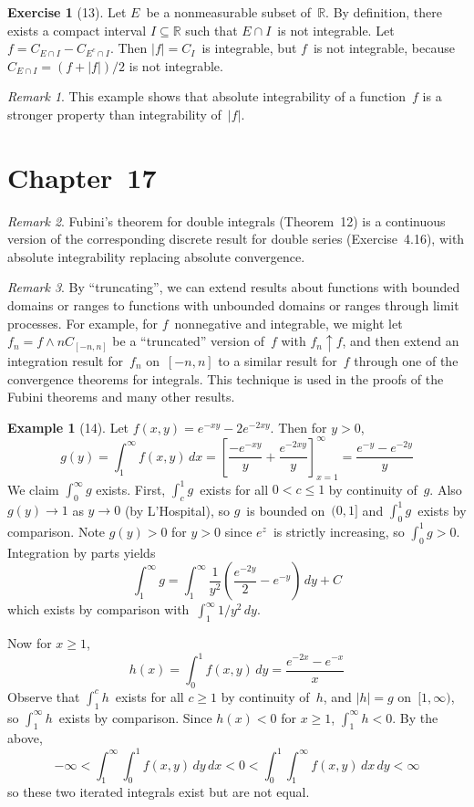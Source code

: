 \documentclass[letterpaper,12pt]{article}
\newcommand{\R}{\mathbb{R}}
\newcommand{\upto}{\uparrow}
\newcommand{\sect}{\cap}
\newcommand{\fmin}{\wedge}
\renewcommand{\d}[1]{\,d\!{#1}}
\newcommand{\dx}{\d{x}}
\newcommand{\dy}{\d{y}}
\newcommand{\abs}[1]{|{#1}|}
\newcommand{\comp}[1]{#1^c}
\theoremstyle{plain}
\theoremstyle{definition}
\newtheorem*{exmp}{Example}
\newtheorem*{exer}{Exercise}
\theoremstyle{remark}
\newtheorem*{rmk}{Remark}
\begin{document}
\begin{exer}[13]
Let \(E\)~be a nonmeasurable subset of~\(\R\). By definition, there exists a compact interval \(I\subseteq\R\) such that \(E\sect I\)~is not integrable. Let \(f=C_{E\sect I}-C_{\comp{E}\sect I}\). Then \(\abs{f}=C_I\)~is integrable, but \(f\)~is not integrable, because \(C_{E\sect I}=(f+\abs{f})/2\) is not integrable.
\end{exer}
\begin{rmk}
This example shows that absolute integrability of a function~\(f\) is a stronger property than integrability of~\(\abs{f}\).
\end{rmk}

\section*{Chapter~17}
\begin{rmk}
Fubini's theorem for double integrals (Theorem~12) is a continuous version of the corresponding discrete result for double series (Exercise~4.16), with absolute integrability replacing absolute convergence.
\end{rmk}

\begin{rmk}
By ``truncating'', we can extend results about functions with bounded domains or ranges to functions with unbounded domains or ranges through limit processes. For example, for \(f\)~nonnegative and integrable, we might let \(f_n=f\fmin nC_{[-n,n]}\) be a ``truncated'' version of~\(f\) with \(f_n\upto f\), and then extend an integration result for~\(f_n\) on~\([-n,n]\) to a similar result for~\(f\) through one of the convergence theorems for integrals. This technique is used in the proofs of the Fubini theorems and many other results.
\end{rmk}

\begin{exmp}[14]
Let \(f(x,y)=e^{-xy}-2e^{-2xy}\). Then for \(y>0\),
\[g(y)=\int_1^{\infty}f(x,y)\dx=\left[\frac{-e^{-xy}}{y}+\frac{e^{-2xy}}{y}\right]_{x=1}^{\infty}=\frac{e^{-y}-e^{-2y}}{y}\]
We claim \(\int_0^{\infty}g\) exists. First, \(\int_c^1 g\)~exists for all \(0<c\le 1\) by continuity of~\(g\). Also \(g(y)\to 1\) as \(y\to 0\) (by L'Hospital), so \(g\)~is bounded on~\((0,1]\) and \(\int_0^1 g\)~exists by comparison. Note \(g(y)>0\) for \(y>0\) since \(e^z\)~is strictly increasing, so \(\int_0^1g>0\). Integration by parts yields
\[\int_1^{\infty}g=\int_1^{\infty}\frac{1}{y^2}\left(\frac{e^{-2y}}{2}-e^{-y}\right)\dy+C\]
which exists by comparison with~\(\int_1^{\infty}1/y^2\dy\).

Now for \(x\ge 1\),
\[h(x)=\int_0^1 f(x,y)\dy=\frac{e^{-2x}-e^{-x}}{x}\]
Observe that \(\int_1^c h\)~exists for all \(c\ge 1\) by continuity of~\(h\), and \(\abs{h}=g\) on~\([1,\infty)\), so \(\int_1^{\infty}h\)~exists by comparison. Since \(h(x)<0\) for \(x\ge 1\), \(\int_1^{\infty}h<0\). By the above,
\[-\infty<\int_1^{\infty}\int_0^1 f(x,y)\dy\dx<0<\int_0^1\int_1^{\infty}f(x,y)\dx\dy<\infty\]
so these two iterated integrals exist but are not equal.
\end{exmp}
\end{document}
